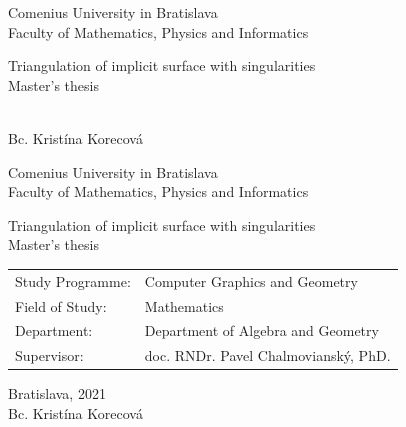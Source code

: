 \documentclass[12pt, twoside]{book}
\def\mfrok{2021}
\def\mfnazov{Triangulation of implicit surface with singularities}
\def\mftyp{Master's thesis}
\def\mfautor{Bc. Kristína Korecová}
\def\mfskolitel{doc. RNDr. Pavel Chalmovianský, PhD. }
\def\mfkonzultant{tit. Meno Priezvisko, tit. }
\def\mfmiesto{Bratislava, \mfrok}
\def\mfodbor{ Mathematics }
\def\program{ Computer Graphics and Geometry }
\def\mfpracovisko{ Department of Algebra and Geometry }
\begin{document}
     
\frontmatter


\thispagestyle{empty}

\begin{center}
\sc\large
Comenius University in Bratislava\\
Faculty of Mathematics, Physics and Informatics

\vfill

{\LARGE\mfnazov}\\
\mftyp
\end{center}

\vfill

{\sc\large 
\noindent \mfrok\\
\mfautor
}

\cleardoublepage


\thispagestyle{empty}
\noindent

\begin{center}
\sc  
\large
Comenius University in Bratislava\\
Faculty of Mathematics, Physics and Informatics

\vfill

{\LARGE\mfnazov}\\
\mftyp
\end{center}

\vfill

\noindent
\begin{tabular}{ll}
Study Programme: & \program \\
Field of Study: & \mfodbor \\
Department: & \mfpracovisko \\
Supervisor: & \mfskolitel \\
\end{tabular}

\vfill


\noindent \mfmiesto\\
\mfautor

\cleardoublepage


\end{document}
